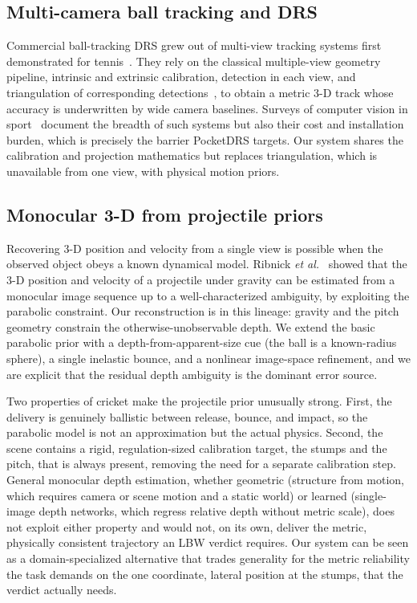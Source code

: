 \documentclass[journal]{IEEEtran}
\begin{document}
\subsection{Multi-camera ball tracking and DRS}
Commercial ball-tracking DRS grew out of multi-view tracking systems first
demonstrated for tennis~\cite{owens2003hawkeye}. They rely on the classical
multiple-view geometry pipeline, intrinsic and extrinsic calibration,
detection in each view, and triangulation of corresponding
detections~\cite{hartley2004mvg}, to obtain a metric 3-D track whose accuracy is
underwritten by wide camera baselines. Surveys of computer vision in
sport~\cite{thomas2017cvsports} document the breadth of such systems but also
their cost and installation burden, which is precisely the barrier PocketDRS
targets. Our system shares the calibration and projection mathematics but
replaces triangulation, which is unavailable from one view, with physical
motion priors.

\subsection{Monocular 3-D from projectile priors}
Recovering 3-D position and velocity from a single view is possible when the
observed object obeys a known dynamical model. Ribnick \emph{et
al.}~\cite{ribnick2009projectiles} showed that the 3-D position and velocity of
a projectile under gravity can be estimated from a monocular image sequence up
to a well-characterized ambiguity, by exploiting the parabolic constraint. Our
reconstruction is in this lineage: gravity and the pitch geometry constrain the
otherwise-unobservable depth. We extend the basic parabolic prior with a
depth-from-apparent-size cue (the ball is a known-radius sphere), a single
inelastic bounce, and a nonlinear image-space refinement, and we are explicit
that the residual depth ambiguity is the dominant error source.

Two properties of cricket make the projectile prior unusually strong. First,
the delivery is genuinely ballistic between release, bounce, and impact, so the
parabolic model is not an approximation but the actual physics. Second, the
scene contains a rigid, regulation-sized calibration target, the stumps and the
pitch, that is always present, removing the need for a separate calibration
step. General monocular depth estimation, whether geometric (structure from
motion, which requires camera or scene motion and a static world) or learned
(single-image depth networks, which regress relative depth without metric
scale), does not exploit either property and would not, on its own, deliver the
metric, physically consistent trajectory an LBW verdict requires. Our system can
be seen as a domain-specialized alternative that trades generality for the
metric reliability the task demands on the one coordinate, lateral position at
the stumps, that the verdict actually needs.
\end{document}
